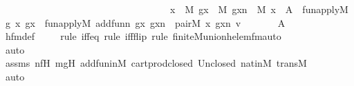 \begin{isabellebody}
\ \ \ \ \ \ \ \ \ \ \ \ \ \ \ \ \ \ \ \ \ \ \ \ \ \ \ \ \ \ \ \ \ \ \ {\isacharparenleft}{\kern0pt}{\isasymexists}x\ {\isasymin}\ M{\isachardot}{\kern0pt}\ {\isasymexists}gx\ {\isasymin}\ M{\isachardot}{\kern0pt}\ {\isasymexists}gxn\ {\isasymin}\ M{\isachardot}{\kern0pt}\ x\ {\isasymnotin}\ A\ {\isasymand}\ fun{\isacharunderscore}{\kern0pt}apply{\isacharparenleft}{\kern0pt}{\isacharhash}{\kern0pt}{\isacharhash}{\kern0pt}M{\isacharcomma}{\kern0pt}\ g{\isacharcomma}{\kern0pt}\ x{\isacharcomma}{\kern0pt}\ gx{\isacharparenright}{\kern0pt}\ {\isasymand}\ fun{\isacharunderscore}{\kern0pt}apply{\isacharparenleft}{\kern0pt}{\isacharhash}{\kern0pt}{\isacharhash}{\kern0pt}M{\isacharcomma}{\kern0pt}\ add{\isacharunderscore}{\kern0pt}fun{\isacharparenleft}{\kern0pt}n{\isacharparenright}{\kern0pt}{\isacharcomma}{\kern0pt}\ gx{\isacharcomma}{\kern0pt}\ gxn{\isacharparenright}{\kern0pt}\ {\isasymand}\ pair{\isacharparenleft}{\kern0pt}{\isacharhash}{\kern0pt}{\isacharhash}{\kern0pt}M{\isacharcomma}{\kern0pt}\ x{\isacharcomma}{\kern0pt}\ gxn{\isacharcomma}{\kern0pt}\ v{\isacharparenright}{\kern0pt}{\isacharparenright}{\kern0pt}\ {\isacharbraceright}{\kern0pt}{\isachardoublequoteclose}\ \isanewline
\ \ \ \ {\isacharparenleft}{\kern0pt}\ {\isachardoublequoteopen}{\isacharquery}{\kern0pt}A\ {\isacharequal}{\kern0pt}\ {\isacharunderscore}{\kern0pt}{\isachardoublequoteclose}{\isacharparenright}{\kern0pt}\isanewline
\ \ \ \ \isanewline
\ \ \ \ \isamarkupfalse%
\ hfm{\isacharunderscore}{\kern0pt}def\isanewline
\ \ \ \ \isamarkupfalse%
{\isacharparenleft}{\kern0pt}rule\ iff{\isacharunderscore}{\kern0pt}eq{\isacharcomma}{\kern0pt}\ rule\ iff{\isacharunderscore}{\kern0pt}flip{\isacharcomma}{\kern0pt}\ rule\ finite{\isacharunderscore}{\kern0pt}M{\isacharunderscore}{\kern0pt}union{\isacharunderscore}{\kern0pt}h{\isacharunderscore}{\kern0pt}elem{\isacharunderscore}{\kern0pt}fm{\isacharunderscore}{\kern0pt}auto{\isacharparenright}{\kern0pt}\isanewline
\ \ \ \ \ \ \ \ \ \ \isamarkupfalse%
\ auto{\isacharbrackleft}{\kern0pt}{}{\isacharbrackright}{\kern0pt}\isanewline
\ \ \ \ \isamarkupfalse%
\ assms\ nfH\ mgH\ add{\isacharunderscore}{\kern0pt}fun{\isacharunderscore}{\kern0pt}in{\isacharunderscore}{\kern0pt}M\ cartprod{\isacharunderscore}{\kern0pt}closed\ Un{\isacharunderscore}{\kern0pt}closed\ nat{\isacharunderscore}{\kern0pt}in{\isacharunderscore}{\kern0pt}M\ transM\ \isanewline
\ \ \ \ \isamarkupfalse%
\ auto\isanewline
\ \ \isamarkupfalse%
\ \isamarkupfalse%

\end{isabellebody}
